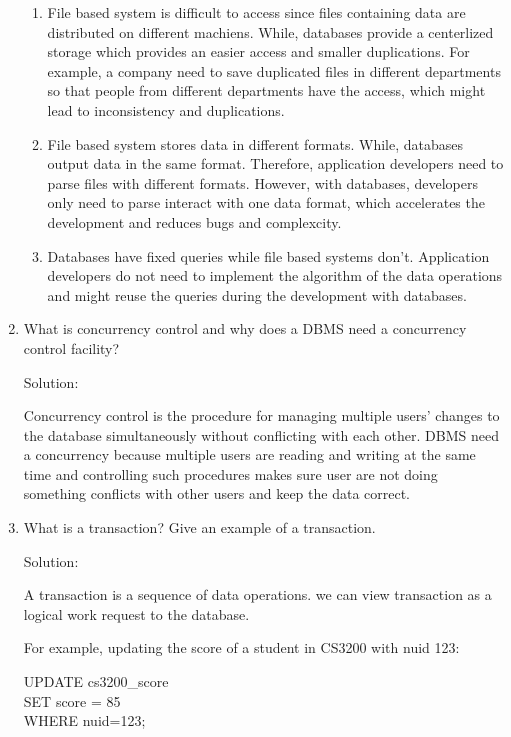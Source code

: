 \documentclass[12pt]{article}
\newcommand{\solu}{{\color{blue} Solution:}}
\begin{document}
\begin{enumerate}
        \begin{enumerate}
            \item File based system is difficult to access since files containing data are distributed on different machiens. While, databases provide a centerlized storage which provides an easier access and smaller duplications. For example, a company need to save duplicated files in different departments so that people from different departments have the access, which might lead to inconsistency and duplications.
            \item File based system stores data in different formats. While, databases output data in the same format. Therefore, application developers need to parse files with different formats. However, with databases, developers only need to parse interact with one data format, which accelerates the development and reduces bugs and complexcity.
            \item Databases have fixed queries while file based systems don't. Application developers do not need to implement the algorithm of the data operations and might reuse the queries during the development with databases.
        \end{enumerate}
        \item What is concurrency control and why does a DBMS need a concurrency control facility?
        
        \solu

        Concurrency control is the procedure for managing multiple users' changes to the database simultaneously without conflicting with each other. DBMS need a concurrency because multiple users are reading and writing at the same time and controlling such procedures makes sure user are not doing something conflicts with other users and keep the data correct.

        \item What is a transaction? Give an example of a transaction. 
        
        \solu

        A transaction is a sequence of data operations. we can view transaction as a logical work request to the database.
        
        For example, updating the score of a student in CS3200 with nuid 123:

        UPDATE cs3200\_score\\
        SET score = 85\\
        WHERE nuid=123;


\end{enumerate}
\end{document}
